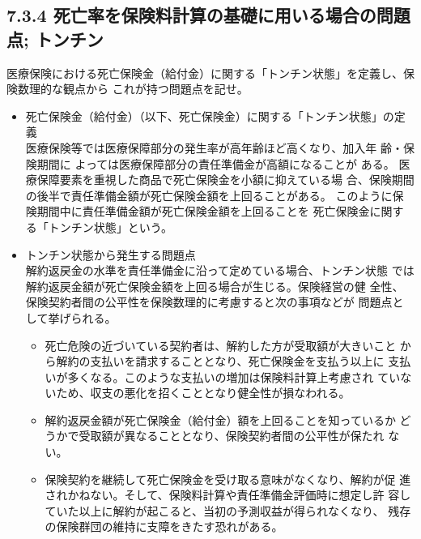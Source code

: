 \documentclass[report,gutter=10mm,fore-edge=10mm,uplatex,dvipdfmx]{jlreq}
\begin{document}
\subsection{7.3.4 死亡率を保険料計算の基礎に用いる場合の問題点; トンチン}
医療保険における死亡保険金（給付金）に関する「トンチン状態」を定義し、保険数理的な観点から
これが持つ問題点を記せ。
\begin{itemize}
 \item  死亡保険金（給付金）（以下、死亡保険金）に関する「トンチン状態」の定義\\
 医療保険等では医療保障部分の発生率が高年齢ほど高くなり、加入年 齢・保険期間に
よっては医療保障部分の責任準備金が高額になることが ある。
医療保障要素を重視した商品で死亡保険金を小額に抑えている場
 合、保険期間の後半で責任準備金額が死亡保険金額を上回ることがある。
 このように保険期間中に責任準備金額が死亡保険金額を上回ることを
 死亡保険金に関する「トンチン状態」という。
 \item  トンチン状態から発生する問題点\\
 解約返戻金の水準を責任準備金に沿って定めている場合、トンチン状態
 では解約返戻金額が死亡保険金額を上回る場合が生じる。保険経営の健
 全性、保険契約者間の公平性を保険数理的に考慮すると次の事項などが
 問題点として挙げられる。
\begin{itemize}
 \item  死亡危険の近づいている契約者は、解約した方が受取額が大きいこと
 から解約の支払いを請求することとなり、死亡保険金を支払う以上に
 支払いが多くなる。このような支払いの増加は保険料計算上考慮され
 ていないため、収支の悪化を招くこととなり健全性が損なわれる。
 \item  解約返戻金額が死亡保険金（給付金）額を上回ることを知っているか
 どうかで受取額が異なることとなり、保険契約者間の公平性が保たれ
 ない。
 \item  保険契約を継続して死亡保険金を受け取る意味がなくなり、解約が促
 進されかねない。そして、保険料計算や責任準備金評価時に想定し許
 容していた以上に解約が起こると、当初の予測収益が得られなくなり、
 残存の保険群団の維持に支障をきたす恐れがある。
\end{itemize}
\end{itemize}
\end{document}
